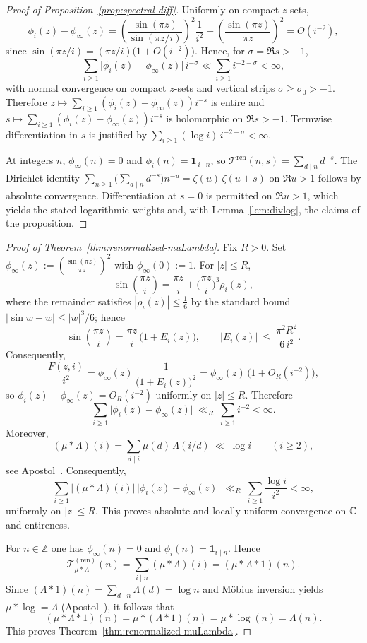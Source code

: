 \begin{proof}[Proof of Proposition~\ref{prop:spectral-diff}]
Uniformly on compact $z$-sets,
\[
\phi_i(z)-\phi_\infty(z)
=\left(\frac{\sin(\pi z)}{\sin(\pi z/i)}\right)^{\!2}\frac{1}{i^2}
-\left(\frac{\sin(\pi z)}{\pi z}\right)^{\!2}
=O(i^{-2}),
\]
since $\sin(\pi z/i)=(\pi z/i)\bigl(1+O(i^{-2})\bigr)$. Hence, for $\sigma=\Re s>-1$,
\[
\sum_{i\ge1}\bigl|\phi_i(z)-\phi_\infty(z)\bigr|\,i^{-\sigma}
\ll \sum_{i\ge1} i^{-2-\sigma}<\infty,
\]
with normal convergence on compact $z$-sets and vertical strips $\sigma\ge\sigma_0>-1$. Therefore $z\mapsto \sum_{i\ge1}(\phi_i(z)-\phi_\infty(z))i^{-s}$ is entire and $s\mapsto \sum_{i\ge1}(\phi_i(z)-\phi_\infty(z))i^{-s}$ is holomorphic on $\Re s>-1$. Termwise differentiation in $s$ is justified by $\sum_{i\ge1}(\log i)\,i^{-2-\sigma}<\infty$.

At integers $n$, $\phi_\infty(n)=0$ and $\phi_i(n)=\mathbf 1_{\,i\mid n}$, so $\mathcal T^{\mathrm{ren}}(n,s)=\sum_{d\mid n} d^{-s}$. The Dirichlet identity $\sum_{n\ge1}\big(\sum_{d\mid n}d^{-s}\big)n^{-u}=\zeta(u)\,\zeta(u+s)$ on $\Re u>1$ follows by absolute convergence. Differentiation at $s=0$ is permitted on $\Re u>1$, which yields the stated logarithmic weights and, with Lemma~\ref{lem:divlog}, the claims of the proposition.
\end{proof}


\begin{proof}[Proof of Theorem~\ref{thm:renormalized-muLambda}]
Fix $R>0$. Set $\phi_\infty(z):=\left(\frac{\sin(\pi z)}{\pi z}\right)^{2}$ with $\phi_\infty(0):=1$. For $|z|\le R$,
\[
\sin\!\left(\frac{\pi z}{i}\right)=\frac{\pi z}{i}+\Big(\frac{\pi z}{i}\Big)^3 \rho_i(z),
\]
where the remainder satisfies $|\rho_i(z)|\le \tfrac{1}{6}$ by the standard bound $|\sin w - w|\le |w|^3/6$; hence
\[
\sin\!\left(\frac{\pi z}{i}\right)=\frac{\pi z}{i}\,\bigl(1+E_i(z)\bigr),\qquad |E_i(z)|\ \le\ \frac{\pi^2 R^2}{6\,i^{2}}.
\]
Consequently,
\[
\frac{F(z,i)}{i^2}
=\phi_\infty(z)\,\frac{1}{\bigl(1+E_i(z)\bigr)^2}
=\phi_\infty(z)\,\bigl(1+O_R(i^{-2})\bigr),
\]
so $\phi_i(z)-\phi_\infty(z)=O_R(i^{-2})$ uniformly on $|z|\le R$. Therefore
\[
\sum_{i\ge1}\bigl|\phi_i(z)-\phi_\infty(z)\bigr|\ \ll_R\ \sum_{i\ge1} i^{-2}<\infty.
\]
Moreover,
\[
(\mu*\Lambda)(i)=\sum_{d\mid i}\mu(d)\,\Lambda(i/d)\ \ll\ \log i\qquad(i\ge2),
\]
see Apostol~\cite[Ch.~2]{apostol1976}. Consequently,
\[
\sum_{i\ge1}\bigl|(\mu*\Lambda)(i)\bigr|\,\bigl|\phi_i(z)-\phi_\infty(z)\bigr|
\ \ll_R\ \sum_{i\ge1}\frac{\log i}{i^{2}}<\infty,
\]
uniformly on $|z|\le R$. This proves absolute and locally uniform convergence on $\mathbb{C}$ and entireness.

For $n\in\mathbb{Z}$ one has $\phi_\infty(n)=0$ and $\phi_i(n)=\mathbf{1}_{i\mid n}$. Hence
\[
\mathcal{T}^{(\mathrm{ren})}_{\mu*\Lambda}(n)=\sum_{i\mid n}(\mu*\Lambda)(i)=(\mu*\Lambda*1)(n).
\]
Since $(\Lambda*1)(n)=\sum_{d\mid n}\Lambda(d)=\log n$ and Möbius inversion yields $\mu*\log=\Lambda$ (Apostol~\cite[Ch.~2]{apostol1976}), it follows that
\[
(\mu*\Lambda*1)(n)=\mu*(\Lambda*1)(n)=\mu*\log(n)=\Lambda(n).
\]
This proves Theorem~\ref{thm:renormalized-muLambda}.
\end{proof}

